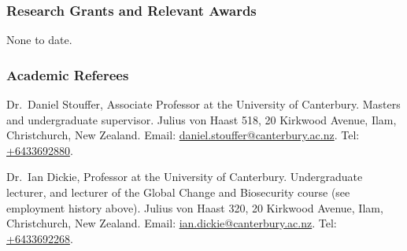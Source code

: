 \documentclass[a4paper,12pt]{article}
\begin{document}
\subsubsection*{Research Grants and Relevant Awards}

None to date.

\clearpage

\subsubsection*{Academic Referees}

Dr.\ Daniel Stouffer, Associate Professor at the University of Canterbury.
Masters and undergraduate supervisor.
Julius von Haast 518, 20 Kirkwood Avenue, Ilam, Christchurch, New Zealand.
Email: \href{mailto:daniel.stouffer@canterbury.ac.nz}{daniel.stouffer@canterbury.ac.nz}.
Tel: \href{tel:+6433692880}{+6433692880}.

Dr.\ Ian Dickie, Professor at the University of Canterbury.
Undergraduate lecturer, and lecturer of the Global Change and Biosecurity course (see employment history above).
Julius von Haast 320, 20 Kirkwood Avenue, Ilam, Christchurch, New Zealand.
Email: \href{mailto:ian.dickie@canterbury.ac.nz}{ian.dickie@canterbury.ac.nz}.
Tel: \href{tel:+6433692268}{+6433692268}.
\end{document}
